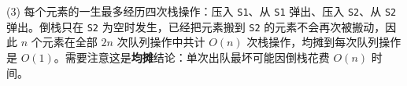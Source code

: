 \begin{enumerate}[resume]
(3) 每个元素的一生最多经历四次栈操作：压入 \texttt{S1}、从 \texttt{S1} 弹出、压入 \texttt{S2}、从 \texttt{S2} 弹出。倒栈只在 \texttt{S2} 为空时发生，已经把元素搬到 \texttt{S2} 的元素不会再次被搬动，因此 $n$ 个元素在全部 $2n$ 次队列操作中共计 $O(n)$ 次栈操作，均摊到每次队列操作是 $O(1)$。需要注意这是\textbf{均摊}结论：单次出队最坏可能因倒栈花费 $O(n)$ 时间。
\par\noindent{}\else \answerarea[10] \fi

\end{enumerate}

\vspace{8pt}
